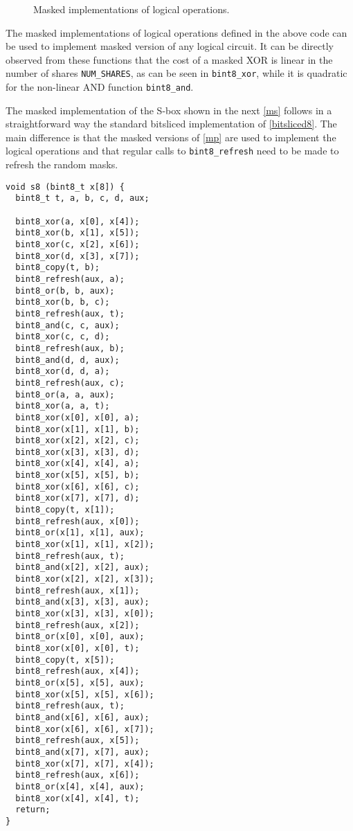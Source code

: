 \begin{figure}[!hbt]
\caption{Masked implementations of logical operations\label{mp}.} 
\end{figure}

The masked implementations of logical operations defined in the above code can be used
to implement masked version of any logical circuit. It can be directly observed
from these functions that the cost of a masked XOR is linear in the number of
shares \texttt{NUM_SHARES}, as can be seen in \texttt{bint8_xor},
while it is quadratic for the non-linear AND function \texttt{bint8_and}.

The masked implementation of the \littlun S-box shown in the next \autoref{ms} follows in a
straightforward way the standard bitsliced implementation of \autoref{bitsliced8}. The main
difference is that the masked versions of \autoref{mp} are used to implement the logical
operations and that regular calls to \texttt{bint8_refresh} need to be
made to refresh the random masks. 

\begin{verbatim}
void s8 (bint8_t x[8]) {
  bint8_t t, a, b, c, d, aux;

  bint8_xor(a, x[0], x[4]);
  bint8_xor(b, x[1], x[5]);
  bint8_xor(c, x[2], x[6]);
  bint8_xor(d, x[3], x[7]);
  bint8_copy(t, b);
  bint8_refresh(aux, a);
  bint8_or(b, b, aux);
  bint8_xor(b, b, c);
  bint8_refresh(aux, t);
  bint8_and(c, c, aux);
  bint8_xor(c, c, d);
  bint8_refresh(aux, b);
  bint8_and(d, d, aux);
  bint8_xor(d, d, a);
  bint8_refresh(aux, c);
  bint8_or(a, a, aux);
  bint8_xor(a, a, t);
  bint8_xor(x[0], x[0], a);
  bint8_xor(x[1], x[1], b);
  bint8_xor(x[2], x[2], c);
  bint8_xor(x[3], x[3], d);
  bint8_xor(x[4], x[4], a);
  bint8_xor(x[5], x[5], b);
  bint8_xor(x[6], x[6], c);
  bint8_xor(x[7], x[7], d);
  bint8_copy(t, x[1]);
  bint8_refresh(aux, x[0]);
  bint8_or(x[1], x[1], aux);
  bint8_xor(x[1], x[1], x[2]);
  bint8_refresh(aux, t);
  bint8_and(x[2], x[2], aux);
  bint8_xor(x[2], x[2], x[3]);
  bint8_refresh(aux, x[1]);
  bint8_and(x[3], x[3], aux);
  bint8_xor(x[3], x[3], x[0]);
  bint8_refresh(aux, x[2]);
  bint8_or(x[0], x[0], aux);
  bint8_xor(x[0], x[0], t);
  bint8_copy(t, x[5]);
  bint8_refresh(aux, x[4]);
  bint8_or(x[5], x[5], aux);
  bint8_xor(x[5], x[5], x[6]);
  bint8_refresh(aux, t);
  bint8_and(x[6], x[6], aux);
  bint8_xor(x[6], x[6], x[7]);
  bint8_refresh(aux, x[5]);
  bint8_and(x[7], x[7], aux);
  bint8_xor(x[7], x[7], x[4]);
  bint8_refresh(aux, x[6]);
  bint8_or(x[4], x[4], aux);
  bint8_xor(x[4], x[4], t);
  return;
}
\end{verbatim}

